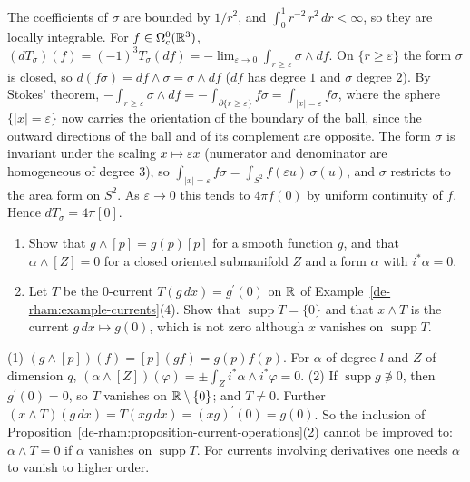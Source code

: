 \begin{solution}
The coefficients of $\sigma$ are bounded by $1/r^2$, and $\int_0^1r^{-2}\,r^2\,dr < \infty$, so they are locally integrable. For $f \in \Omega^0_c(\mathbb{R}^3)$, $(dT_\sigma)(f) = (-1)^3T_\sigma(df) = -\lim_{\varepsilon \to 0}\int_{r \geq \varepsilon}\sigma \wedge df$.
On $\{r \geq \varepsilon\}$ the form $\sigma$ is closed, so $d(f\sigma) = df \wedge \sigma = \sigma \wedge df$ ($df$ has degree $1$ and $\sigma$ degree $2$). By Stokes' theorem,
$-\int_{r \geq \varepsilon}\sigma \wedge df = -\int_{\partial\{r \geq \varepsilon\}}f\sigma = \int_{|x| = \varepsilon}f\sigma$, where the sphere $\{|x| = \varepsilon\}$ now carries the orientation of the boundary of the ball,
since the outward directions of the ball and of its complement are opposite. The form $\sigma$ is invariant under the scaling $x \mapsto \varepsilon x$ (numerator and denominator are homogeneous of degree $3$),
so $\int_{|x| = \varepsilon}f\sigma = \int_{S^2}f(\varepsilon u)\,\sigma(u)$, and $\sigma$ restricts to the area form on $S^2$. As $\varepsilon \to 0$ this tends to $4\pi f(0)$ by uniform continuity of $f$.
Hence $dT_\sigma = 4\pi[0]$.
\end{solution}

\begin{exercise}\label{de-rham:exercise-current-products-functions}
\begin{enumerate}
\item Show that $g \wedge [p] = g(p)[p]$ for a smooth function $g$, and that $\alpha \wedge [Z] = 0$ for a closed oriented submanifold $Z$ and a form $\alpha$ with $i^*\alpha = 0$.
\item Let $T$ be the $0$-current $T(g\,dx) = g^{\prime}(0)$ on $\mathbb{R}$ of Example~\ref{de-rham:example-currents}(4). Show that $\operatorname{supp}T = \{0\}$ and that $x \wedge T$ is the current
$g\,dx \mapsto g(0)$, which is not zero although $x$ vanishes on $\operatorname{supp}T$.
\end{enumerate}
\end{exercise}

\begin{solution}
(1) $(g \wedge [p])(f) = [p](gf) = g(p)f(p)$. For $\alpha$ of degree $l$ and $Z$ of dimension $q$, $(\alpha \wedge [Z])(\varphi) = \pm\int_Zi^*\alpha \wedge i^*\varphi = 0$.
(2) If $\operatorname{supp}g \not\ni 0$, then $g^{\prime}(0) = 0$, so $T$ vanishes on $\mathbb{R} \setminus \{0\}$; and $T \neq 0$. Further $(x \wedge T)(g\,dx) = T(xg\,dx) = (xg)^{\prime}(0) = g(0)$. So the inclusion
of Proposition~\ref{de-rham:proposition-current-operations}(2) cannot be improved to: $\alpha \wedge T = 0$ if $\alpha$ vanishes on $\operatorname{supp}T$. For currents involving derivatives one needs
$\alpha$ to vanish to higher order.
\end{solution}

